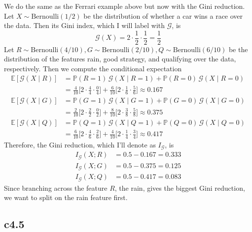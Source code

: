   \begin{example}
    We do the same as the Ferrari example above but now with the Gini reduction. Let $X \sim \mathrm{Bernoulli}(1/2)$ be the distribution of whether a car wins a race over the data. Then its Gini index, which I will label with $\mathcal{G}$, is \[\mathcal{G} (X) = 2 \cdot \frac{1}{2} \cdot \frac{1}{2} = \frac{1}{2}\]
    Let $R \sim \mathrm{Bernoulli}(4/10), G \sim \mathrm{Bernoulli}(2/10), Q \sim \mathrm{Bernoulli}(6/10)$ be the distribution of the features rain, good strategy, and qualifying over the data, respectively. Then we compute the conditional expectation 
    \begin{align*}
        \mathbb{E}[\mathcal{G}(X \mid R)] & = \mathbb{P}(R = 1)\, \mathcal{G}(X \mid R = 1) + \mathbb{P}(R = 0) \, \mathcal{G}(X \mid R = 0) \\ 
        & = \frac{4}{10} \bigg[ 2 \cdot \frac{4}{4} \cdot \frac{0}{4} \bigg] + \frac{6}{10} \bigg[ 2 \cdot \frac{1}{6} \cdot \frac{5}{6} \bigg] \approx 0.167 \\
        \mathbb{E}[\mathcal{G}(X \mid G)] & = \mathbb{P}(G = 1)\, \mathcal{G}(X \mid G = 1) + \mathbb{P}(G = 0) \, \mathcal{G}(X \mid G = 0) \\ 
        & = \frac{2}{10} \bigg[ 2 \cdot \frac{2}{2} \cdot \frac{0}{2} \bigg] + \frac{8}{10} \bigg[ 2 \cdot \frac{3}{8} \cdot \frac{5}{8} \bigg] \approx 0.375 \\
        \mathbb{E}[\mathcal{G}(X \mid Q)] & = \mathbb{P}(Q = 1)\, \mathcal{G}(X \mid Q = 1) + \mathbb{P}(Q = 0) \, \mathcal{G}(X \mid Q = 0) \\ 
        & = \frac{6}{10} \bigg[ 2 \cdot \frac{4}{6} \cdot \frac{2}{6} \bigg] + \frac{4}{10} \bigg[ 2 \cdot \frac{1}{4} \cdot \frac{3}{4} \bigg] \approx 0.417
    \end{align*}
    Therefore, the Gini reduction, which I'll denote as $I_{\mathcal{G}}$, is 
    \begin{align*}
        I_{\mathcal{G}} (X ; R) & = 0.5 - 0.167 = 0.333 \\
        I_{\mathcal{G}} (X ; G) & = 0.5 - 0.375 = 0.125 \\
        I_{\mathcal{G}} (X ; Q) & = 0.5 - 0.417 = 0.083
    \end{align*}
    Since branching across the feature $R$, the rain, gives the biggest Gini reduction, we want to split on the rain feature first. 
  \end{example}

\subsection{c4.5} 
